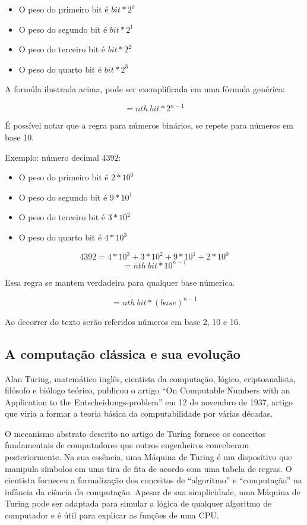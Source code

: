 \begin{itemize}
  \item O peso do primeiro bit é $bit * 2^0$
  \item O peso do segundo bit é $bit * 2^1$
  \item O peso do terceiro bit é $bit * 2^2$
  \item O peso do quarto bit é $bit * 2^3$
\end{itemize}

A formúla ilustrada acima, pode ser exemplificada em uma fórmula genérica: 

\[= nth\: bit * 2^{n-1}\]

É possível notar que a regra para números binários, se repete para números em base 10.

Exemplo: número decimal $4392$:
\begin{itemize}
  \item O peso do primeiro bit é $2 * 10^0$
  \item O peso do segundo bit é $9 * 10^1$
  \item O peso do terceiro bit é $3 * 10^2$
  \item O peso do quarto bit é $4 * 10^3$
\end{itemize}
\[ 4392 = 4*10^3 + 3*10^2 + 9*10^1 + 2*10^0\]
\[= nth\: bit * 10^{n-1}\]

Essa regra se mantem verdadeira para qualquer base númerica.

\[= nth\: bit * (base)^{n-1}\]

Ao decorrer do texto serão referidos números em base 2, 10 e 16. 

\subsection{A computação clássica e sua evolução}
Alan Turing, matemático inglês, cientista da computação, lógico, criptoanalista, filósofo e biólogo teórico, publicou o artigo “On Computable Numbers with an Application to the Entscheidungs-problem”\cite{8} em 12 de novembro de 1937, artigo que viria a formar a teoria básica da computabilidade por várias décadas.

O mecanismo abstrato descrito no artigo de Turing fornece os conceitos fundamentais de computadores que outros engenheiros conceberam posteriormente. Na sua essência, uma Máquina de Turing é um dispositivo que manipula símbolos em uma tira de fita de acordo com uma tabela de regras. O cientista forneceu a formalização dos conceitos de “algoritmo” e “computação” na infância da ciência da computação. Apesar de sua simplicidade, uma Máquina de Turing pode ser adaptada para simular a lógica de qualquer algoritmo de computador e é útil para explicar as funções de uma CPU.

